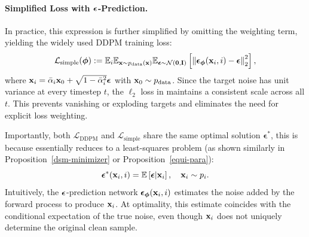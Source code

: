 \paragraph{Simplified Loss with ${\bm{\epsilon}}$-Prediction.}
In practice, this expression is further simplified by omitting the weighting term, yielding the widely used DDPM training loss:
\begin{equation}\label{eq:ddpm-simple-loss}
    \mathcal{L}_{\text{simple}}(\bm{\phi}) := \mathbb{E}_{i} \mathbb{E}_{{\mathbf{x}} \sim p_{\text{data}}({\mathbf{x}})} \mathbb{E}_{\boldsymbol{\epsilon} \sim \mathcal{N}(\mathbf{0}, \mathbf{I})} \left[ \left\| \boldsymbol{\epsilon}_{\bm{\phi}}({\mathbf{x}}_i, i) - \boldsymbol{\epsilon} \right\|_2^2 \right],
\end{equation}
where ${\mathbf{x}}_i = \bar{\alpha}_i {\mathbf{x}}_0 + \sqrt{1 - \bar{\alpha}_i^2} \boldsymbol{\epsilon}$ with ${\mathbf{x}}_0 \sim p_{\text{data}}$. Since the target noise has unit variance at every timestep $t$, the $\ell_2$ loss in  maintains a consistent scale across all $t$. This prevents vanishing or exploding targets and eliminates the need for explicit loss weighting.


Importantly, both $\mathcal{L}_{\text{DDPM}}$ and $\mathcal{L}_{\text{simple}}$ share the same optimal solution $\boldsymbol{\epsilon}^*$, this is because  essentially reduces to a least-squares problem (as shown similarly in Proposition~\ref{dsm-minimizer} or Proposition~\ref{equi-para}):
\[
\boldsymbol{\epsilon}^*({\mathbf{x}}_i, i) = \mathbb{E}\left[ \boldsymbol{\epsilon}|{\mathbf{x}}_i \right], \quad {\mathbf{x}}_i \sim p_i.
\]
Intuitively, the ${\bm{\epsilon}}$-prediction network $\boldsymbol{\epsilon}_{\bm{\phi}}({\mathbf{x}}_i, i)$ estimates the noise added by the forward process to produce ${\mathbf{x}}_i$. At optimality, this estimate coincides with the conditional expectation of the true noise, even though ${\mathbf{x}}_i$ does not uniquely determine the original clean sample.

